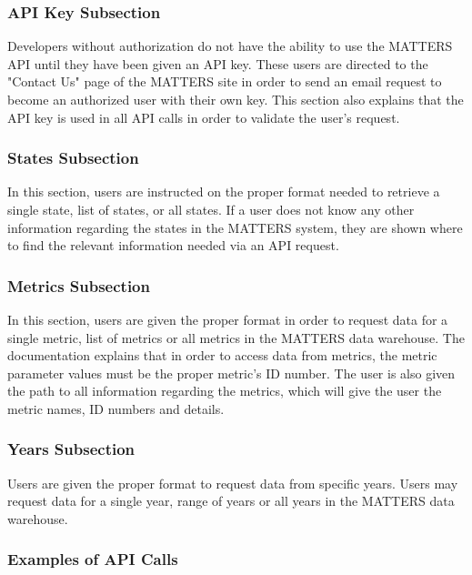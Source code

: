 			\subsubsection{API Key Subsection}
				
				Developers without authorization do not have the ability to use the MATTERS API 
				until they have been given an API key. These users are directed to the "Contact Us" 
				page of the MATTERS site in order to send an email request to become an authorized user with their own key. 
				This section also explains that the API key is used in all 
				API calls in order to validate the user's request.
				
			\subsubsection{States Subsection}
				
				In this section, users are instructed on the proper format needed to retrieve a single state, 
				list of states, or all states. If a user does not know any other information 
				regarding the states in the MATTERS system, they are shown where to find the relevant
				information needed via an API request.
				
			\subsubsection{Metrics Subsection}
				
				In this section, users are given the proper format in order to request data for a single metric, 
				list of metrics or all metrics in the MATTERS data warehouse. The documentation explains 
				that in order to access data from metrics, the metric parameter values must be the 
				proper metric's ID number. The user is also given the path to all information 
				regarding the metrics, which will give the user the metric names, ID numbers and details.
				
			\subsubsection{Years Subsection}
				
				Users are given the proper format to request data from specific years. 
				Users may request data for a single year, range of years or all years in the MATTERS data warehouse. 
				
			\subsubsection{Examples of API Calls}
				
